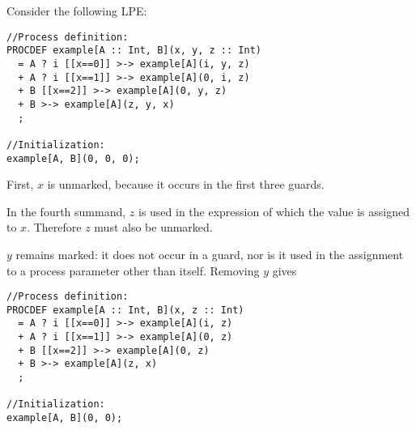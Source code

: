 Consider the following LPE:

\begin{lstlisting}
//Process definition:
PROCDEF example[A :: Int, B](x, y, z :: Int)
  = A ? i [[x==0]] >-> example[A](i, y, z)
  + A ? i [[x==1]] >-> example[A](0, i, z)
  + B [[x==2]] >-> example[A](0, y, z)
  + B >-> example[A](z, y, x)
  ;

//Initialization:
example[A, B](0, 0, 0);
\end{lstlisting}

First, $x$ is unmarked, because it occurs in the first three guards.

In the fourth summand, $z$ is used in the expression of which the value is assigned to $x$.
Therefore $z$ must also be unmarked.

$y$ remains marked: it does not occur in a guard, nor is it used in the assignment to a process parameter other than itself.
Removing $y$ gives

\begin{lstlisting}
//Process definition:
PROCDEF example[A :: Int, B](x, z :: Int)
  = A ? i [[x==0]] >-> example[A](i, z)
  + A ? i [[x==1]] >-> example[A](0, z)
  + B [[x==2]] >-> example[A](0, z)
  + B >-> example[A](z, x)
  ;

//Initialization:
example[A, B](0, 0);
\end{lstlisting}



